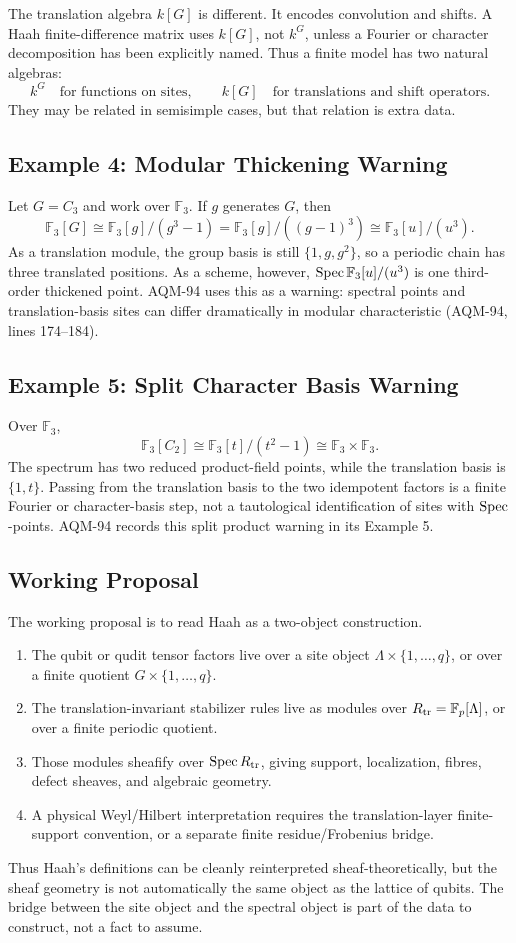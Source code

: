 The translation algebra \(k[G]\) is different.  It encodes convolution and
shifts.  A Haah finite-difference matrix uses \(k[G]\), not \(k^G\), unless a
Fourier or character decomposition has been explicitly named.  Thus a finite
model has two natural algebras:
\[
  k^G \quad\text{for functions on sites},\qquad
  k[G]\quad\text{for translations and shift operators}.
\]
They may be related in semisimple cases, but that relation is extra data.

\subsection{Example 4: Modular Thickening Warning}

Let \(G=C_3\) and work over \(\mathbb F_3\).  If \(g\) generates \(G\), then
\[
  \mathbb F_3[G]\cong \mathbb F_3[g]/(g^3-1)
  =\mathbb F_3[g]/((g-1)^3)
  \cong \mathbb F_3[u]/(u^3).
\]
As a translation module, the group basis is still \(\{1,g,g^2\}\), so a
periodic chain has three translated positions.  As a scheme, however,
\(\operatorname{Spec}\mathbb F_3[u]/(u^3)\) is one third-order thickened point.  AQM-94 uses
this as a warning: spectral points and translation-basis sites can differ
dramatically in modular characteristic (AQM-94, lines 174--184).

\subsection{Example 5: Split Character Basis Warning}

Over \(\mathbb F_3\),
\[
  \mathbb F_3[C_2]\cong \mathbb F_3[t]/(t^2-1)
  \cong \mathbb F_3\times\mathbb F_3.
\]
The spectrum has two reduced product-field points, while the translation basis
is \(\{1,t\}\).  Passing from the translation basis to the two idempotent
factors is a finite Fourier or character-basis step, not a tautological
identification of sites with \(\operatorname{Spec}\)-points.  AQM-94 records this split
product warning in its Example 5.

\subsection{Working Proposal}

The working proposal is to read Haah as a two-object construction.

\begin{enumerate}
\item The qubit or qudit tensor factors live over a site object
\(\Lambda\times\{1,\ldots,q\}\), or over a finite quotient
\(G\times\{1,\ldots,q\}\).
\item The translation-invariant stabilizer rules live as modules over
\(R_{\rm tr}=\mathbb F_p[\Lambda]\), or over a finite periodic quotient.
\item Those modules sheafify over \(\operatorname{Spec} R_{\rm tr}\), giving support,
localization, fibres, defect sheaves, and algebraic geometry.
\item A physical Weyl/Hilbert interpretation requires the translation-layer
finite-support convention, or a separate finite residue/Frobenius bridge.
\end{enumerate}

Thus Haah's definitions can be cleanly reinterpreted sheaf-theoretically, but
the sheaf geometry is not automatically the same object as the lattice of
qubits.  The bridge between the site object and the spectral object is part of
the data to construct, not a fact to assume.
